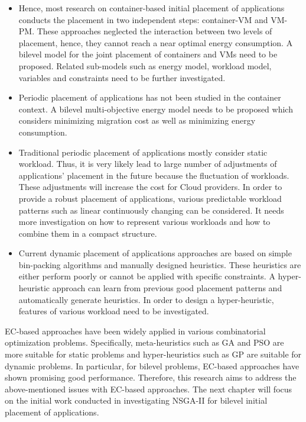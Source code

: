 \begin{itemize}
	\item {} Hence, most research on container-based initial placement of applications conducts the placement in two independent steps: container-VM and VM-PM. These approaches neglected the interaction between two levels of placement, hence, they cannot reach a near optimal energy consumption. A bilevel model for the joint placement of containers and VMs need to be proposed. Related sub-models such as energy model, workload model, variables and constraints need to be further investigated.
	\item Periodic placement of applications has not been studied in the container context. A bilevel multi-objective energy model needs to be proposed which considers minimizing migration cost as well as minimizing energy consumption. 
	\item Traditional periodic placement of applications mostly consider static workload. Thus, it is very likely lead to large number of adjustments of applications' placement in the future because the fluctuation of workloads. These adjustments will increase the cost for Cloud providers. In order to provide a robust placement of applications, various predictable workload patterns such as linear continuously changing can be considered. It needs more investigation on how to represent various workloads and how to combine them in a compact structure.
	\item Current dynamic placement of applications approaches are based on simple bin-packing algorithms and manually designed heuristics. These heuristics are either perform poorly or cannot be applied with specific constraints. A hyper-heuristic approach can learn from previous good placement patterns and automatically generate heuristics. In order to design a hyper-heuristic, features of various workload need to be investigated. 
\end{itemize}

EC-based approaches have been widely applied in various combinatorial optimization problems. Specifically, meta-heuristics such as GA and PSO are more suitable for static problems and hyper-heuristics such as GP are suitable for dynamic problems. In particular, for bilevel problems, EC-based approaches have shown promising good performance. Therefore, this research aims to address the above-mentioned issues with EC-based approaches. The next chapter will focus on the initial work conducted in investigating NSGA-II for bilevel initial placement of applications.

